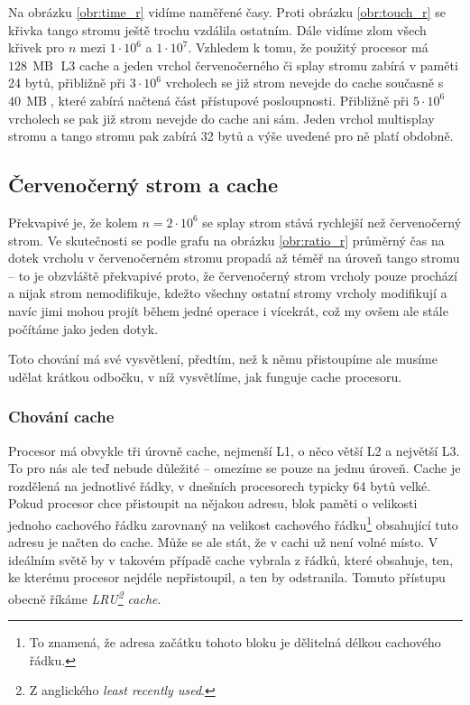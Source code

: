 
Na obrázku \ref{obr:time_r} vidíme naměřené časy. Proti obrázku \ref{obr:touch_r}
se křivka tango stromu ještě trochu vzdálila ostatním. Dále vidíme zlom všech
křivek pro $n$ mezi $1\cdot10^6$ a $1\cdot 10^7$. Vzhledem k tomu, že použitý
procesor má $128\,\operatorname{MB}$ L3 cache a jeden vrchol  červenočerného či
splay stromu zabírá v paměti 24 bytů, přibližně při $3\cdot 10^6$ vrcholech se již
strom nevejde do cache současně s $40\,\operatorname{MB}$, které zabírá načtená
část přístupové posloupnosti. Přibližně při $5\cdot10^6$ vrcholech se pak již strom nevejde do cache ani sám.
Jeden vrchol multisplay stromu a tango stromu pak zabírá 32 bytů a výše uvedené pro ně platí obdobně. 


\subsection{Červenočerný strom a cache}\label{sec:rb_and_cache}

Překvapivé je, že kolem $n=2\cdot10^6$ se splay strom stává rychlejší než
červenočerný strom. Ve skutečnosti se podle grafu na obrázku \ref{obr:ratio_r}
průměrný čas na dotek vrcholu v červenočerném stromu propadá až téměř na úroveň tango
stromu -- to je obzvláště překvapivé proto, že červenočerný strom vrcholy pouze
prochází a nijak strom nemodifikuje, kdežto všechny ostatní stromy vrcholy
modifikují a navíc jimi mohou projít během jedné operace i vícekrát, což my
ovšem ale stále počítáme jako jeden dotyk.

Toto chování má své vysvětlení, předtím, než k němu přistoupíme ale musíme
udělat krátkou odbočku, v níž vysvětlíme, jak funguje cache procesoru.

\subsubsection{Chování cache}

Procesor má obvykle tři úrovně cache, nejmenší L1, o něco větší L2 a největší
L3. To pro nás ale teď nebude důležité -- omezíme se pouze na jednu úroveň.
Cache je rozdělená na jednotlivé řádky, v dnešních procesorech typicky 64 bytů
velké. Pokud procesor chce přistoupit na nějakou adresu, blok paměti o
velikosti jednoho cachového řádku zarovnaný na velikost cachového
řádku\footnote{To znamená, že adresa začátku tohoto bloku je dělitelná délkou
cachového řádku.} obsahující tuto adresu je načten do cache. Může se ale stát,
že v cachi už není volné místo. V ideálním světě by v takovém případě cache
vybrala z řádků, které obsahuje, ten, ke kterému procesor nejdéle nepřistoupil,
a ten by odstranila. Tomuto přístupu obecně říkáme \emph{LRU\footnote{Z
anglického \emph{least recently used}.} cache}.

